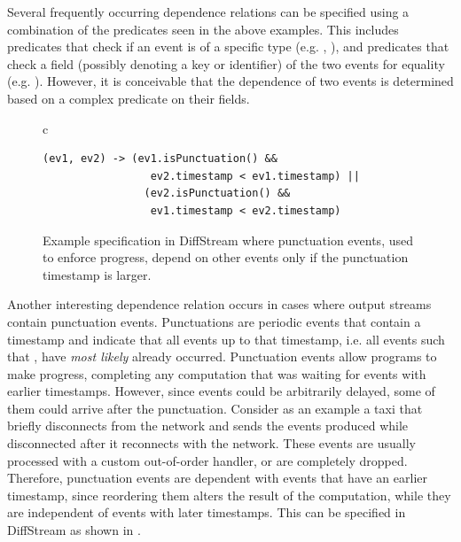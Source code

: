 Several frequently occurring dependence relations can be specified
using a combination of the predicates seen in the above examples. This
includes predicates that check if an event is of a specific type
(e.g. , ), and predicates that
check a field (possibly denoting a key or identifier) of the two
events for equality (e.g. ). However, it is conceivable that the dependence of two
events is determined based on a complex predicate on their fields.

\begin{figure}[t]
  \centering \footnotesize{}
\begin{tabular}{c}
\begin{lstlisting}[basicstyle=\ttfamily\small,linewidth=10cm]
  (ev1, ev2) -> (ev1.isPunctuation() &&
                 ev2.timestamp < ev1.timestamp) ||
                (ev2.isPunctuation() &&
                 ev1.timestamp < ev2.timestamp)
\end{lstlisting}
\end{tabular}
  \caption[DiffStream example specification 4.]{Example specification in DiffStream where punctuation events, used to enforce progress, depend on other events only if the punctuation timestamp is larger.}
  \label{diffstream:fig:punctuation-example-dependencies}
\end{figure}

Another interesting dependence relation occurs in cases where output streams contain punctuation events.
Punctuations are periodic events that contain a timestamp and indicate
that all events up to that timestamp, i.e. all events  such that , have \emph{most likely} already occurred.
Punctuation events allow programs to make progress, completing any
computation that was waiting for events with earlier
timestamps. However, since events could be arbitrarily delayed, some
of them could arrive after the punctuation.
Consider as an example a taxi that briefly
disconnects from the network and sends the events produced while disconnected
after it reconnects with the network. These events are usually
processed with a custom out-of-order handler, or are completely
dropped. Therefore, punctuation events are dependent with events
that have an earlier timestamp, since reordering them alters the result of the computation, while they are independent of events with later timestamps. This can be specified in DiffStream as
shown in .

